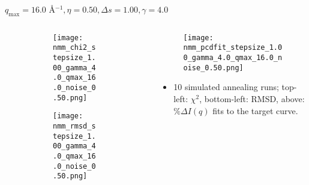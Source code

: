 \documentclass{beamer}
\begin{document}
\begin{frame}{$ q_{\textrm{max}}=16.0 $ \AA $^{-1}, \eta=0.50, \Delta s=1.00, \gamma=4.0$}
	\begin{columns}
		\begin{column}{.5\textwidth}
			\begin{figure}[H]
			\centering
			\begin{subfigure}[b]{\textwidth}
				\centering
				\texttt{[image: nmm\_chi2\_stepsize\_1.00\_gamma\_4.0\_qmax\_16.0\_noise\_0.50.png]}
				\label{fig:}
			\end{subfigure}
			\begin{subfigure}[b]{\textwidth}
				\centering
				\texttt{[image: nmm\_rmsd\_stepsize\_1.00\_gamma\_4.0\_qmax\_16.0\_noise\_0.50.png]}
				\label{fig:}
			\end{subfigure}
			\end{figure}
		\end{column}
		\begin{column}{.5\textwidth}
			\begin{figure}[H]
				\centering
				\texttt{[image: nmm\_pcdfit\_stepsize\_1.00\_gamma\_4.0\_qmax\_16.0\_noise\_0.50.png]}
				\label{fig:}
			\end{figure}
			\begin{itemize}
				\item 10 simulated annealing runs; top-left: $\chi^2$, bottom-left: RMSD, above: $\%\Delta I(q)$ fits to the target curve.
			\end{itemize}
		\end{column}
	\end{columns}
\end{frame}
 
\end{document}
